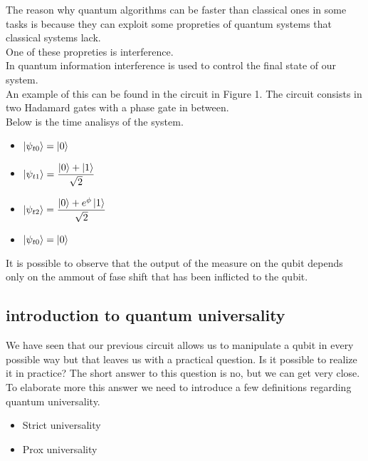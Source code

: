 \documentclass{article}
\begin{document}
The reason why quantum algorithms can be faster than classical ones
in some tasks is because they can exploit some propreties of quantum
systems that classical systems lack.\\
One of these propreties is interference.\\
In quantum information interference is used to control the final
state of our system.\\
An example of this can be found in the circuit in Figure 1.
The circuit consists in two Hadamard gates with a phase gate
in between.\\
Below is the time analisys of the system.
\begin{itemize}

\item $\ket{\psi_{t0}} = \ket{0}$
\item $\ket{\psi_{t1}} = \dfrac{\ket{0}+\ket{1}}{\sqrt{2}}$
\item $\ket{\psi_{t2}} = \dfrac{\ket{0}+e^{\phi}\ket{1}}{\sqrt{2}}$
\item $\ket{\psi_{t0}} = \ket{0}$
  
  
\end{itemize}



It is possible to observe that the output of the measure on the qubit
depends only on the ammout of fase shift that has been inflicted
to the qubit.



\subsection{introduction to quantum universality}

We have seen that our previous circuit allows us to manipulate a qubit
in every possible way but that leaves us with a practical question.
Is it possible to realize it in practice?
The short answer to this question is no, but we can get very close.
To elaborate more this answer we need to introduce a few definitions
regarding quantum universality.
\begin{itemize}

\item
  Strict universality

\item
  Prox universality

\end{itemize}
\end{document}
